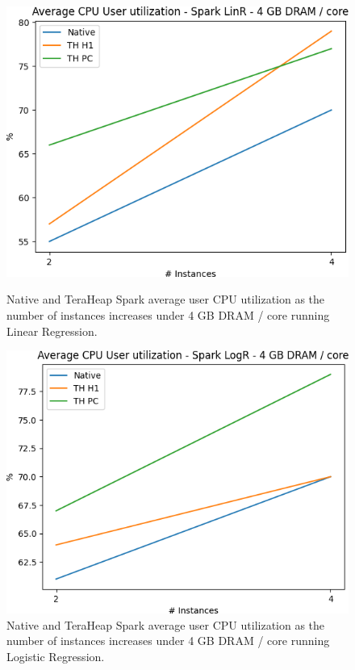 \begin{figure}[thbp]
	\centering
        \includegraphics[width=\linewidth]{./fig/LINR_64_USR.png}
    \caption{Native and TeraHeap Spark average user CPU utilization
        as the number of instances increases under 4 GB DRAM / core running Linear Regression.}
		\label{fig:linr_64_usr}
    \includegraphics[width=\linewidth]{./fig/LOGR_64_USR.png}
    \caption{Native and TeraHeap Spark average user CPU utilization
        as the number of instances increases under 4 GB DRAM / core running Logistic Regression.}
	   \label{fig:logr_64_usr}
\end{figure}

